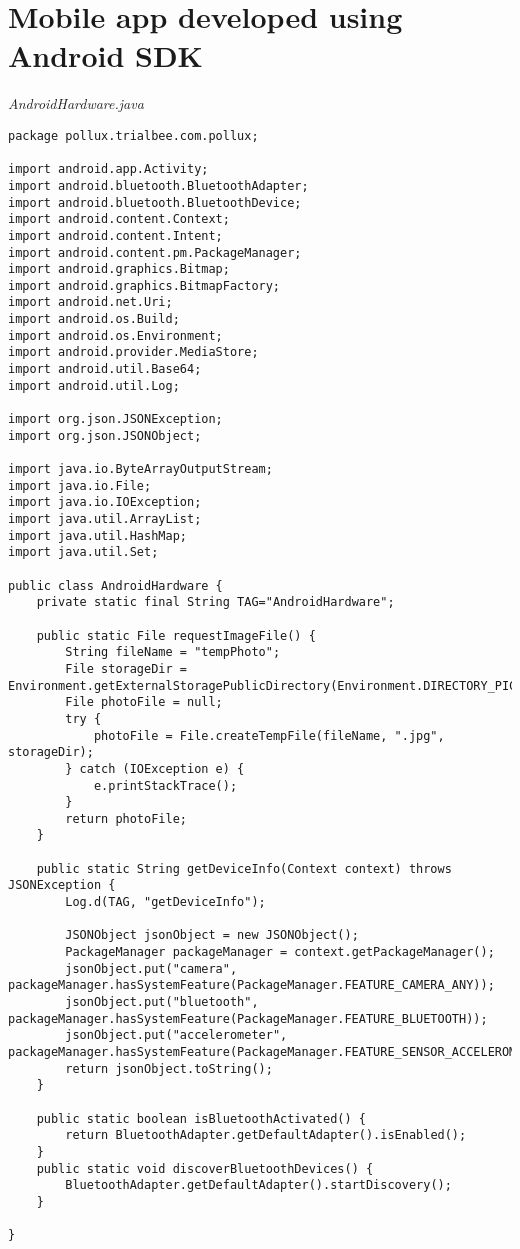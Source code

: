 \newpage
\appendix
\section{Mobile app developed using Android SDK} \label{App:AppendixA}

\emph{AndroidHardware.java}
\begin{lstlisting}
package pollux.trialbee.com.pollux;

import android.app.Activity;
import android.bluetooth.BluetoothAdapter;
import android.bluetooth.BluetoothDevice;
import android.content.Context;
import android.content.Intent;
import android.content.pm.PackageManager;
import android.graphics.Bitmap;
import android.graphics.BitmapFactory;
import android.net.Uri;
import android.os.Build;
import android.os.Environment;
import android.provider.MediaStore;
import android.util.Base64;
import android.util.Log;

import org.json.JSONException;
import org.json.JSONObject;

import java.io.ByteArrayOutputStream;
import java.io.File;
import java.io.IOException;
import java.util.ArrayList;
import java.util.HashMap;
import java.util.Set;

public class AndroidHardware {
    private static final String TAG="AndroidHardware";

    public static File requestImageFile() {
        String fileName = "tempPhoto";
        File storageDir = Environment.getExternalStoragePublicDirectory(Environment.DIRECTORY_PICTURES);
        File photoFile = null;
        try {
            photoFile = File.createTempFile(fileName, ".jpg", storageDir);
        } catch (IOException e) {
            e.printStackTrace();
        }
        return photoFile;
    }

    public static String getDeviceInfo(Context context) throws JSONException {
        Log.d(TAG, "getDeviceInfo");

        JSONObject jsonObject = new JSONObject();
        PackageManager packageManager = context.getPackageManager();
        jsonObject.put("camera", packageManager.hasSystemFeature(PackageManager.FEATURE_CAMERA_ANY));
        jsonObject.put("bluetooth", packageManager.hasSystemFeature(PackageManager.FEATURE_BLUETOOTH));
        jsonObject.put("accelerometer", packageManager.hasSystemFeature(PackageManager.FEATURE_SENSOR_ACCELEROMETER));
        return jsonObject.toString();
    }

    public static boolean isBluetoothActivated() {
        return BluetoothAdapter.getDefaultAdapter().isEnabled();
    }
    public static void discoverBluetoothDevices() {
        BluetoothAdapter.getDefaultAdapter().startDiscovery();
    }

}
\end{lstlisting}
